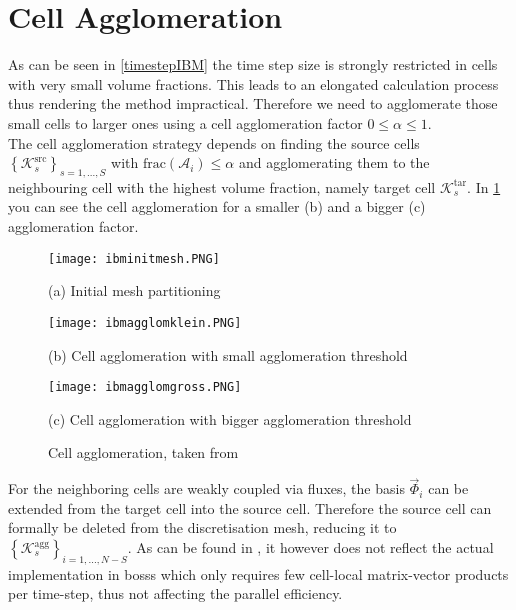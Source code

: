 	\section{Cell Agglomeration}
	\label{cellAgglomeration}
	As can be seen in \eqref{timestepIBM} the time step size is strongly restricted in cells with very small volume fractions. This leads to an elongated calculation process thus rendering the method impractical. Therefore we need to agglomerate those small cells to larger ones using a cell agglomeration factor $0 \leq \alpha \leq 1$. \\
	The cell agglomeration strategy depends on finding the source cells $\left\{\mathcal{K}_s^\text{src} \right\}_{s=1,...,S}$ with $\text{frac}(\mathcal{A}_i) \leq \alpha$ and agglomerating them to the neighbouring cell with the highest volume fraction, namely target cell $\mathcal{K}_s^\text{tar}$. In \cref{fig:agglomeration} you can see the cell agglomeration for a smaller (b) and a bigger (c) agglomeration factor. \\
	\begin{figure}[htp]
		\centering
		\begin{minipage}[b]{0.3\textwidth}
			\centering
			\texttt{[image: ibminitmesh.PNG]}
			\caption*{(a) Initial mesh partitioning \newline \newline}
			\label{fig:init}
		\end{minipage}%
		\begin{minipage}[b]{0.3\textwidth}
			\centering
			\texttt{[image: ibmagglomklein.PNG]}
			\caption*{(b) Cell agglomeration with small agglomeration threshold}
			\label{fig:agglomgklein}
		\end{minipage}
		\begin{minipage}[b]{0.3\textwidth}
			\centering
			\texttt{[image: ibmagglomgross.PNG]}
			\caption*{(c) Cell agglomeration with bigger agglomeration threshold}
			\label{fig:agglomgross}
		\end{minipage}%
		\caption{Cell agglomeration, taken from \cite{paper}}\label{fig:agglomeration}
	\end{figure}
	
	For the neighboring cells are weakly coupled via fluxes, the basis $\vec{\Phi}_i$ can be extended from the target cell into the source cell. Therefore the source cell can formally be deleted from the discretisation mesh, reducing it to $\left\{\mathcal{K}_s^\text{agg} \right\}_{i=1,...,N-S}$.
	As can be found in \textcite{paper}, it however does not reflect the actual implementation in \gls{bosss} which only requires few cell-local matrix-vector products per time-step, thus not affecting the parallel efficiency.
	
